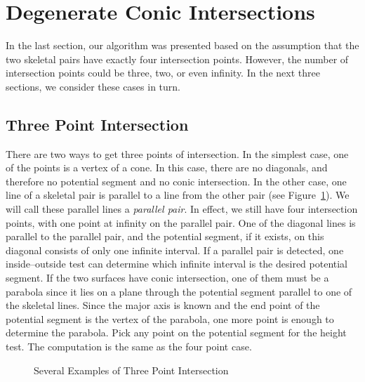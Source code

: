 
\section{Degenerate Conic Intersections}
\label{section:special-degenerate}
     In the last section, our algorithm was presented based on the assumption 
that the two skeletal pairs have exactly four intersection points.  However, 
the number of intersection points could be three, two, or even infinity.  In 
the next three sections, we consider these cases in turn.


\subsection{Three Point Intersection}
\label{section:three-point}
     There are two ways to get three points of intersection.  In the simplest 
case, one of the points is a vertex of a cone.  In this case, there are no
diagonals, and therefore no potential segment and no conic intersection.  In 
the other case, one line of a skeletal pair is parallel to a line from the 
other pair (see Figure~\ref{fig:three-point}).  We will call these parallel 
lines a {\em parallel pair}.  In effect, we still have four intersection 
points, with one point at infinity on the parallel pair.  One of the diagonal 
lines is parallel to the parallel pair, and the potential segment, if it 
exists, on this diagonal consists of only one infinite interval.  If a 
parallel pair is detected, one inside--outside test can determine which 
infinite interval is the desired potential segment.  
If the two surfaces have conic intersection, one of them must be a parabola
since it lies on a plane through the potential segment parallel to one of the
skeletal lines.  Since the major axis is known and the end point of the 
potential segment is the vertex of the parabola, one more point is enough to 
determine the parabola.  Pick any point on the potential segment for the 
height test.  The computation is the same as the four point case.
\begin{figure}
\vspace{7cm}
\caption{Several Examples of Three Point Intersection}
\label{fig:three-point}
\end{figure}

